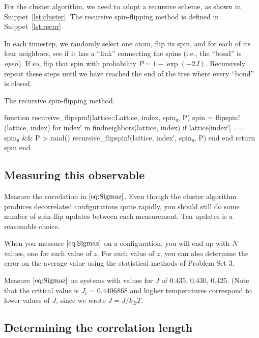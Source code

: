 For the cluster algorithm, we need to adopt a recursive scheme, as shown in
Snippet~\ref{lst:cluster}. The recursive spin-flipping method is defined in
Snippet~\ref{lst:recur}.

In each timestep, we randomly select one atom, flip its spin, and for each of its four
neighbors, see if it has a ``link'' connecting the spins (i.e., the ``bond'' is \emph{open}).
If so, flip that spin with probability \(P = 1 - \exp(-2J)\).
Recursively repeat these steps until we have reached the end of the tree where
every ``bond'' is closed.

\begin{algorithm}
    \caption{The recursive spin-flipping method.}
    \label{lst:recur}
    \begin{juliacode}
        function recursive_flipspin!(lattice::Lattice, index, spin₀, P)
            spin = flipspin!(lattice, index)
            for index′ in findneighbors(lattice, index)
                if lattice[index′] == spin₀ && P > rand()
                    recursive_flipspin!(lattice, index′, spin₀, P)
                end
            end
            return spin
        end
    \end{juliacode}
\end{algorithm}

\subsection{Measuring this observable}

Measure the correlation in \(\eqref{eq:Sigmaz}\). Even
though the cluster algorithm produces decorrelated configurations quite rapidly, you should
still do some number of spin-flip updates between each measurement. Ten updates is a
reasonable choice.

When you measure \(\eqref{eq:Sigmaz}\) on a configuration, you will end up with \(N\)
values, one for each value of \(z\). For each value of \(z\), you can also determine the
error on the average value using the statistical methods of Problem Set 3.

\Question{} Measure \(\eqref{eq:Sigmaz}\) on systems with values for \(J\) of \(0.435\),
\(0.430\), \(0.425\). (Note that the critical value is \(J_c = 0.4406868\) and higher
temperatures correspond to lower values of \(J\), since we wrote \(J = \bar{J} / k_B T\).

\subsection{Determining the correlation length}

